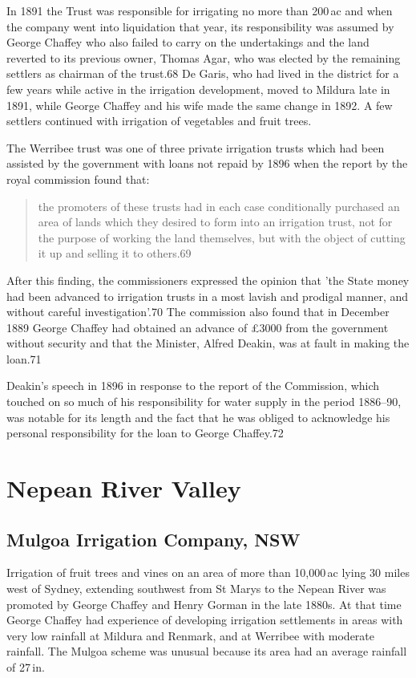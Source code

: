 In 1891 the Trust was responsible for irrigating no more than 200\,ac
and when the company went into liquidation that year, its
responsibility was assumed by George Chaffey who also failed to carry
on the undertakings and the land reverted to its previous owner,
Thomas Agar, who was elected by the remaining settlers as chairman of
the trust.68 De Garis, who had lived in the district for a few years
while active in the irrigation development, moved to Mildura late in
1891, while George Chaffey and his wife made the same change in 1892.
A few settlers continued with irrigation of vegetables and fruit
trees.

The Werribee trust was one of three private irrigation trusts which
had been assisted by the government with loans not repaid by 1896 when
the report by the royal commission found that:
\begin{quote}
	the promoters of these trusts had in each case conditionally
	purchased an area of lands which they desired to form into an
	irrigation trust, not for the purpose of working the land
	themselves, but with the object of cutting it up and selling
	it to others.69
\end{quote}
After this finding, the commissioners expressed the opinion that 'the
State money had been advanced to irrigation trusts in a most lavish
and prodigal manner, and without careful investigation'.70 The
commission also found that in December 1889 George Chaffey had
obtained an advance of \pounds3000 from the government without
security and that the Minister, Alfred Deakin, was at fault in making
the loan.71

Deakin's speech in 1896 in response to the report of the Commission,
which touched on so much of his responsibility for water supply in the
period 1886--90, was notable for its length and the fact that he was
obliged to acknowledge his personal responsibility for the loan to
George Chaffey.72

\section{Nepean River Valley}

\subsection{Mulgoa Irrigation Company, NSW}

Irrigation of fruit trees and vines on an area of more than 10,000\,ac
lying 30 miles west of Sydney, extending southwest from St Marys to
the Nepean River was promoted by George Chaffey and Henry Gorman in
the late 1880s. At that time George Chaffey had experience of
developing irrigation settlements in areas with very low rainfall at
Mildura and Renmark, and at Werribee with moderate rainfall. The
Mulgoa scheme was unusual because its area had an average rainfall of
27\,in.

